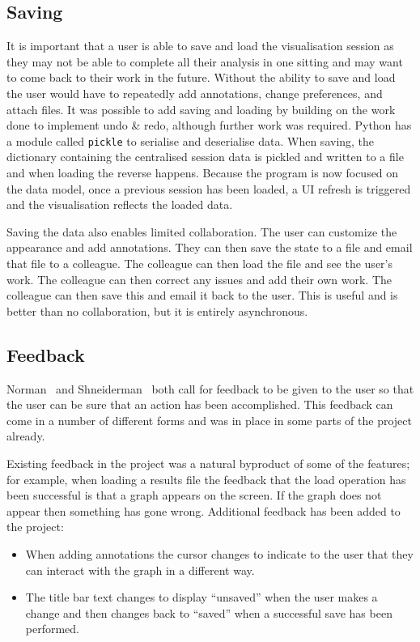 \subsection{Saving}

It is important that a user is able to save and load the visualisation session as they may not be able to complete all their analysis in one sitting and may want to come back to their work in the future.  Without the ability to save and load the user would have to repeatedly add annotations, change preferences, and attach files.  It was possible to add saving and loading by building on the work done to implement undo \& redo, although further work was required. Python has a module called \texttt{pickle} to serialise and deserialise data.  When saving, the dictionary containing the centralised session data is pickled and written to a file and when loading the reverse happens.  Because the program is now focused on the data model, once a previous session has been loaded, a \ac{UI} refresh is triggered and the visualisation reflects the loaded data.

Saving the data also enables limited collaboration.  The user can customize the appearance and add annotations.  They can then save the state to a file and email that file to a colleague.  The colleague can then load the file and see the user's work.  The colleague can then correct any issues and add their own work.  The colleague can then save this and email it back to the user.  This is useful and is better than no collaboration, but it is entirely asynchronous.

\subsection{Feedback}
Norman~\cite{normsev} and Shneiderman~\cite{shgold} both call for feedback to be given to the user so that the user can be sure that an action has been accomplished.  This feedback can come in a number of different forms and was in place in some parts of the project already.

Existing feedback in the project was a natural byproduct of some of the features; for example, when loading a results file the feedback that the load operation has been successful is that a graph appears on the screen. If the graph does not appear then something has gone wrong.  Additional feedback has been added to the project:
\begin{itemize}
\item When adding annotations the cursor changes to indicate to the user that they can interact with the graph in a different way.
\item The title bar text changes to display ``unsaved'' when the user makes a change and then changes back to ``saved'' when a successful save has been performed.
\end{itemize}

